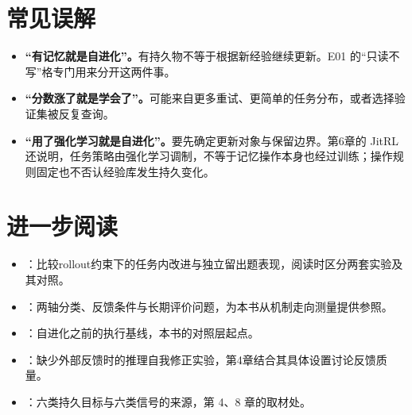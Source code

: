 \section*{常见误解}
\begin{itemize}
  \item \textbf{“有记忆就是自进化”。}有持久物不等于根据新经验继续更新。E01 的“只读不写”格专门用来分开这两件事。
  \item \textbf{“分数涨了就是学会了”。}可能来自更多重试、更简单的任务分布，或者选择验证集被反复查询。
  \item \textbf{“用了强化学习就是自进化”。}要先确定更新对象与保留边界。第6章的 JitRL 还说明，任务策略由强化学习调制，不等于记忆操作本身也经过训练；操作规则固定也不否认经验库发生持久变化。
\end{itemize}

\clearpage
\section*{进一步阅读}
\begin{itemize}[itemsep=2pt,topsep=4pt,parsep=0pt]
  \item \cite{harness-eval-2607}：比较rollout约束下的任务内改进与独立留出题表现，阅读时区分两套实验及其对照。
  \item \cite{rsi-survey-2607}：两轴分类、反馈条件与长期评价问题，为本书从机制走向测量提供参照。
  \item \cite{react-2210}：自进化之前的执行基线，本书的对照层起点。
  \item \cite{self-correct-negative-2310}：缺少外部反馈时的推理自我修正实验，第4章结合其具体设置讨论反馈质量。
  \item \cite{coding-survey-2608}：六类持久目标与六类信号的来源，第 4、8 章的取材处。
\end{itemize}
